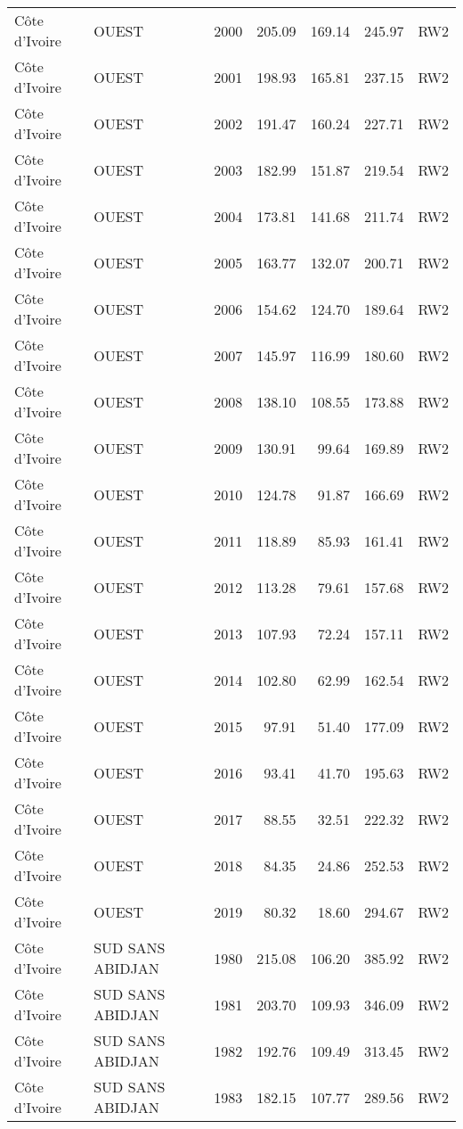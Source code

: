 \begin{longtable}{lllrrrl}
  C\^{o}te d'Ivoire & OUEST & 2000 & 205.09 & 169.14 & 245.97 & RW2 \\ 
  C\^{o}te d'Ivoire & OUEST & 2001 & 198.93 & 165.81 & 237.15 & RW2 \\ 
  C\^{o}te d'Ivoire & OUEST & 2002 & 191.47 & 160.24 & 227.71 & RW2 \\ 
  C\^{o}te d'Ivoire & OUEST & 2003 & 182.99 & 151.87 & 219.54 & RW2 \\ 
  C\^{o}te d'Ivoire & OUEST & 2004 & 173.81 & 141.68 & 211.74 & RW2 \\ 
  C\^{o}te d'Ivoire & OUEST & 2005 & 163.77 & 132.07 & 200.71 & RW2 \\ 
  C\^{o}te d'Ivoire & OUEST & 2006 & 154.62 & 124.70 & 189.64 & RW2 \\ 
  C\^{o}te d'Ivoire & OUEST & 2007 & 145.97 & 116.99 & 180.60 & RW2 \\ 
  C\^{o}te d'Ivoire & OUEST & 2008 & 138.10 & 108.55 & 173.88 & RW2 \\ 
  C\^{o}te d'Ivoire & OUEST & 2009 & 130.91 & 99.64 & 169.89 & RW2 \\ 
  C\^{o}te d'Ivoire & OUEST & 2010 & 124.78 & 91.87 & 166.69 & RW2 \\ 
  C\^{o}te d'Ivoire & OUEST & 2011 & 118.89 & 85.93 & 161.41 & RW2 \\ 
  C\^{o}te d'Ivoire & OUEST & 2012 & 113.28 & 79.61 & 157.68 & RW2 \\ 
  C\^{o}te d'Ivoire & OUEST & 2013 & 107.93 & 72.24 & 157.11 & RW2 \\ 
  C\^{o}te d'Ivoire & OUEST & 2014 & 102.80 & 62.99 & 162.54 & RW2 \\ 
  C\^{o}te d'Ivoire & OUEST & 2015 & 97.91 & 51.40 & 177.09 & RW2 \\ 
  C\^{o}te d'Ivoire & OUEST & 2016 & 93.41 & 41.70 & 195.63 & RW2 \\ 
  C\^{o}te d'Ivoire & OUEST & 2017 & 88.55 & 32.51 & 222.32 & RW2 \\ 
  C\^{o}te d'Ivoire & OUEST & 2018 & 84.35 & 24.86 & 252.53 & RW2 \\ 
  C\^{o}te d'Ivoire & OUEST & 2019 & 80.32 & 18.60 & 294.67 & RW2 \\ 
  C\^{o}te d'Ivoire & SUD SANS ABIDJAN & 1980 & 215.08 & 106.20 & 385.92 & RW2 \\ 
  C\^{o}te d'Ivoire & SUD SANS ABIDJAN & 1981 & 203.70 & 109.93 & 346.09 & RW2 \\ 
  C\^{o}te d'Ivoire & SUD SANS ABIDJAN & 1982 & 192.76 & 109.49 & 313.45 & RW2 \\ 
  C\^{o}te d'Ivoire & SUD SANS ABIDJAN & 1983 & 182.15 & 107.77 & 289.56 & RW2 \\ 

\end{longtable}
